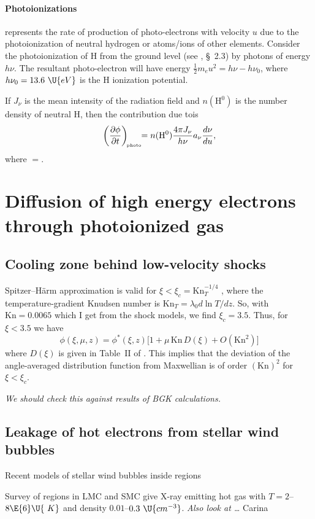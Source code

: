 \documentclass{emulateapj}
\newcommand\Kn{\ensuremath{\mathrm{Kn}}}
\newcommand\pcc{\U{cm^{-3}}}
\newcommand\hii{\ion{H}{2}}
\begin{document}
\paragraph{Photoionizations}  represents the rate of
production of photo-electrons with velocity \(u\) due to the
photoionization of neutral hydrogen or atoms/ions of other elements.
Consider the photoionization of H from the ground level (see
\citealp{2006agna.book.....O}, \S~2.3) by photons of energy \(h\nu\).
The resultant photo-electron will have energy \(\frac12 m_e u^2 = h\nu
- h\nu_0\), where \(h\nu_0 = 13.6~\U{eV}\) is the H ionization
potential. 

If \(J_\nu\) is the mean intensity of the radiation field and
\(n(\mathrm{H^0})\) is the number density of neutral H, then the
contribution due tois
\begin{equation}
  \label{eq:6}
  \biggl( \frac{\partial \phi}{\partial t} \biggr)_{\!\scriptscriptstyle\mathrm{photo}} \!\! = n(\mathrm{H^0}) \frac{4\pi J_\nu}{h\nu} a_\nu \frac{d\nu}{d u},
\end{equation}
where \( = \). 

\section{Diffusion of high energy electrons through photoionized gas}
\label{sec:diff-high-energy}


\subsection{Cooling zone behind low-velocity shocks}
\label{sec:cooling-zone-behind}

Spitzer--Härm approximation is valid for \(\xi < \xi_c =
\Kn_{T}^{-1/4}\) \citep{Shoub:1983a}, where the temperature-gradient Knudsen number is
\(\Kn_T = \lambda_0 d\ln T/ d z\). So, with \(\Kn = 0.0065\) which I
get from the shock models, we find \(\xi_c = 3.5\). Thus, for \(\xi <
3.5\) we have 
\begin{equation}
  \label{eq:7}
  \phi(\xi, \mu, z) = \phi^*(\xi, z) \biggl[ 
  1 + \mu\, \Kn\, D(\xi) + O(\Kn^2)
  \biggr]
\end{equation}
where \(D(\xi)\) is given in Table~II of \citet{Spitzer:1953a}.  This
implies that the deviation of the angle-averaged distribution function
from  Maxwellian is of order \((\Kn)^2\) for \(\xi < \xi_c\).

\textit{We should check this against results of BGK calculations. }


\subsection{Leakage of hot electrons from stellar wind bubbles}
\label{sec:diff-hot-electr}

Recent models of stellar wind bubbles inside \hii{} regions \citep{Mackey:2015a}

Survey of \hii{} regions in LMC and SMC \citep{Lopez:2014a} give X-ray
emitting hot gas with \(T = 2\)--\(8\E{6}\U{\ K}\) and density
\(0.01\)--\(0.3\ \pcc\). \textit{Also look at \dots } Carina \citep{Townsley:2011b}

\clearpage


\end{document}
